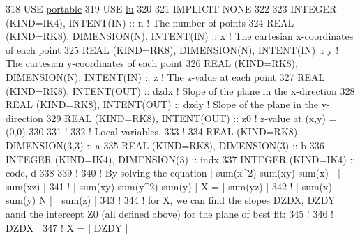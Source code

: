 \begin{DoxyCode}
318 \textcolor{keywordtype}{USE }\hyperlink{namespaceportable}{portable}
319 \textcolor{keywordtype}{USE }\hyperlink{namespacelu}{lu}
320 
321 \textcolor{keywordtype}{IMPLICIT NONE}
322 
323 \textcolor{keywordtype}{INTEGER (KIND=IK4)}, \textcolor{keywordtype}{INTENT(IN)}              :: n            \textcolor{comment}{! The number of points}
324 \textcolor{keywordtype}{REAL (KIND=RK8)}, \textcolor{keywordtype}{DIMENSION(N)}, \textcolor{keywordtype}{INTENT(IN)}   :: x            \textcolor{comment}{! The cartesian x-coordinates of each point}
325 \textcolor{keywordtype}{REAL (KIND=RK8)}, \textcolor{keywordtype}{DIMENSION(N)}, \textcolor{keywordtype}{INTENT(IN)}   :: y            \textcolor{comment}{! The cartesian y-coordinates of each point}
326 \textcolor{keywordtype}{REAL (KIND=RK8)}, \textcolor{keywordtype}{DIMENSION(N)}, \textcolor{keywordtype}{INTENT(IN)}   :: z            \textcolor{comment}{! The z-value at each point}
327 \textcolor{keywordtype}{REAL (KIND=RK8)}, \textcolor{keywordtype}{INTENT(OUT)}                :: dzdx         \textcolor{comment}{! Slope of the plane in the x-direction}
328 \textcolor{keywordtype}{REAL (KIND=RK8)}, \textcolor{keywordtype}{INTENT(OUT)}                :: dzdy         \textcolor{comment}{! Slope of the plane in the y-direction}
329 \textcolor{keywordtype}{REAL (KIND=RK8)}, \textcolor{keywordtype}{INTENT(OUT)}                :: z0           \textcolor{comment}{! z-value at (x,y) = (0,0)}
330 
331 \textcolor{comment}{!}
332 \textcolor{comment}{! Local variables.}
333 \textcolor{comment}{!}
334 \textcolor{keywordtype}{REAL (KIND=RK8)}, \textcolor{keywordtype}{DIMENSION(3,3)}             :: a 
335 \textcolor{keywordtype}{REAL (KIND=RK8)}, \textcolor{keywordtype}{DIMENSION(3)}               :: b
336 \textcolor{keywordtype}{INTEGER (KIND=IK4)}, \textcolor{keywordtype}{DIMENSION(3)}            :: indx
337 \textcolor{keywordtype}{INTEGER (KIND=IK4)}                          :: code, d
338 
339 \textcolor{comment}{!}
340 \textcolor{comment}{! By solving the equation    | sum(x^2)  sum(xy)     sum(x)  |     | sum(xz) |}
341 \textcolor{comment}{!                            | sum(xy)   sum(y^2)    sum(y)  | X = | sum(yz) |}
342 \textcolor{comment}{!                            | sum(x)    sum(y)      N       |     | sum(z)  |}
343 \textcolor{comment}{!}
344 \textcolor{comment}{! for X, we can find the slopes DZDX, DZDY aand the intercept Z0 (all defined above) for the plane of best
       fit:}
345 \textcolor{comment}{!}
346 \textcolor{comment}{!     | DZDX |}
347 \textcolor{comment}{! X = | DZDY |}

\end{DoxyCode}
